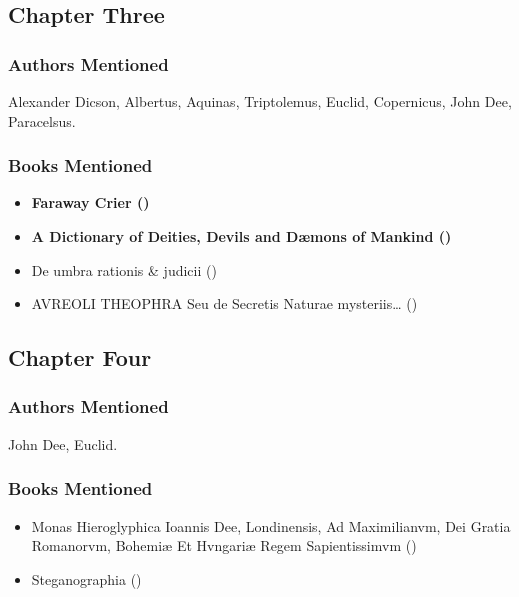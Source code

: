 \documentclass[
]{article}
\providecommand{\tightlist}{%
  \setlength{\itemsep}{0pt}\setlength{\parskip}{0pt}}
\begin{document}
\subsection{Chapter Three}\label{chapter-three-2}

\subsubsection{Authors Mentioned}\label{authors-mentioned-21}

Alexander Dicson, Albertus, Aquinas, Triptolemus, Euclid, Copernicus,
John Dee, Paracelsus.

\subsubsection{Books Mentioned}\label{books-mentioned-21}

\begin{itemize}
\tightlist
\item
  \textbf{Faraway Crier ()}
\item
  \textbf{A Dictionary of Deities, Devils and Dæmons of Mankind
  ()}
\item
  De umbra rationis \& judicii ()
\item
  AVREOLI THEOPHRA Seu de Secretis Naturae mysteriis\ldots{}
  ()
\end{itemize}

\subsection{Chapter Four}\label{chapter-four-2}

\subsubsection{Authors Mentioned}\label{authors-mentioned-22}

John Dee, Euclid.

\subsubsection{Books Mentioned}\label{books-mentioned-22}

\begin{itemize}
\tightlist
\item
  Monas Hieroglyphica Ioannis Dee, Londinensis, Ad Maximilianvm, Dei
  Gratia Romanorvm, Bohemiæ Et Hvngariæ Regem Sapientissimvm
  ()
\item
  Steganographia ()
\end{itemize}
\end{document}

